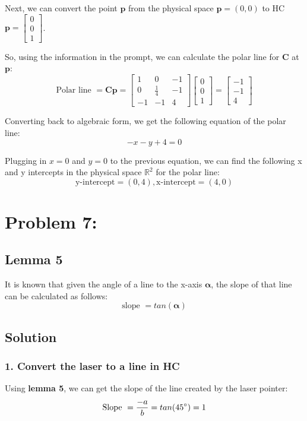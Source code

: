 \documentclass{article}
\begin{document}
Next, we can convert the point $\boldsymbol{p}$ from the physical space \(\boldsymbol{p} = (0,0)\) to HC \(\boldsymbol{p} = \begin{bmatrix}
    0 \\ 0 \\ 1
\end{bmatrix}\).

So, using the information in the prompt, we can calculate the polar line for \(\boldsymbol{C}\) at \(\boldsymbol{p}\):
\[\text{Polar line } = \boldsymbol{Cp} = \begin{bmatrix}
    1 & 0 & -1 \\
    0 & \frac{1}{4} & -1 \\
    -1 & -1 & 4
\end{bmatrix} \begin{bmatrix}
    0 \\ 0 \\ 1
\end{bmatrix} = \begin{bmatrix}
    -1 \\ -1 \\ 4
\end{bmatrix}\]

Converting back to algebraic form, we get the following equation of the polar line:
\[-x -y + 4 = 0\]

Plugging in \(x = 0\) and \(y = 0\) to the previous equation, we can find the following x and y intercepts in the physical space $\mathbb{R}^2$ for the polar line:
\[\text{y-intercept} = (0, 4), \text{x-intercept} = (4,0)\]

\newpage
\section*{Problem 7:}
\subsection*{Lemma 5}
It is known that given the angle of a line to the x-axis $\boldsymbol{\alpha}$, the slope of that line can be calculated as follows:
\[\text{slope } = tan(\boldsymbol{\alpha})\]

\subsection*{Solution}
\subsubsection*{1. Convert the laser to a line in HC}
Using \textbf{lemma 5}, we can get the slope of the line created by the laser pointer:
\[\text{Slope } = \frac{-a}{b} = tan(45\degree) = 1\]
\end{document}
